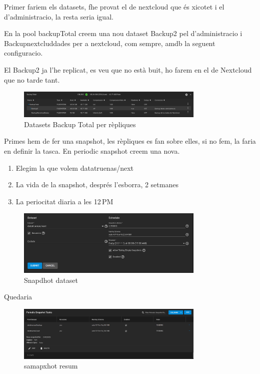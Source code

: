 \documentclass[
  10pt,
]{krantz}
\providecommand{\tightlist}{%
  \setlength{\itemsep}{0pt}\setlength{\parskip}{0pt}}
\begin{document}
Primer fariem els datasets, fhe provat el de nextcloud que és xicotet i el d'administracio, la resta seria igual.

En la pool backupTotal creem una nou dataset Backup2 pel d'administracio i Backupnextcluddades per a nextcloud, com sempre, amdb la seguent configuracio.

El Backup2 ja l'he replicat, es veu que no està buit, ho farem en el de Nextcloud que no tarde tant.

\begin{figure}
\centering
\includegraphics[width=0.8\textwidth,height=\textheight]{imatges/proxmox/datasets_bac_total.png}
\caption{Datasets Backup Total per rèpliques}
\end{figure}

Primes hem de fer una snapshot, les rèpliques es fan sobre elles, si no fem, la faria en definir la tasca. En periodic snapshot creem una nova.

\begin{enumerate}
\def\labelenumi{\arabic{enumi}.}
\tightlist
\item
  Elegim la que volem datatruenas/next
\item
  La vida de la snapshot, després l'esborra, 2 setmanes
\item
  La periocitat diaria a les 12\,PM
\end{enumerate}

\begin{figure}
\centering
\includegraphics[width=0.8\textwidth,height=\textheight]{imatges/proxmox/snapshot_dataset.png}
\caption{Snapdhot dataset}
\end{figure}

Quedaria

\begin{figure}
\centering
\includegraphics[width=0.8\textwidth,height=\textheight]{imatges/proxmox/snapshot_resum.png}
\caption{samapxhot resum}
\end{figure}
\end{document}
